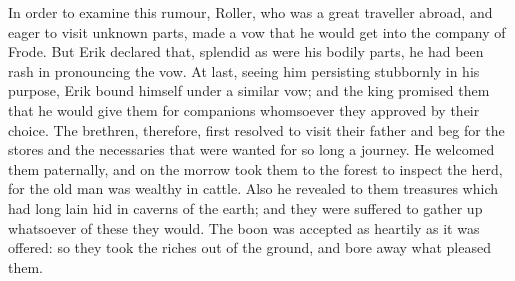 \documentclass[10pt,a4paper]{report}
\begin{document}
In order to examine this rumour, Roller, who was a great traveller abroad, and eager to visit unknown parts, made a vow that he would get into the company of Frode. But Erik declared that, splendid as were his bodily parts, he had been rash in pronouncing the vow. At last, seeing him persisting stubbornly in his purpose, Erik bound himself under a similar vow; and the king promised them that he would give them for companions whomsoever they approved by their choice. The brethren, therefore, first resolved to visit their father and beg for the stores and the necessaries that were wanted for so long a journey. He welcomed them paternally, and on the morrow took them to the forest to inspect the herd, for the old man was wealthy in cattle. Also he revealed to them treasures which had long lain hid in caverns of the earth; and they were suffered to gather up whatsoever of these they would. The boon was accepted as heartily as it was offered: so they took the riches out of the ground, and bore away what pleased them.\\
\end{document}
